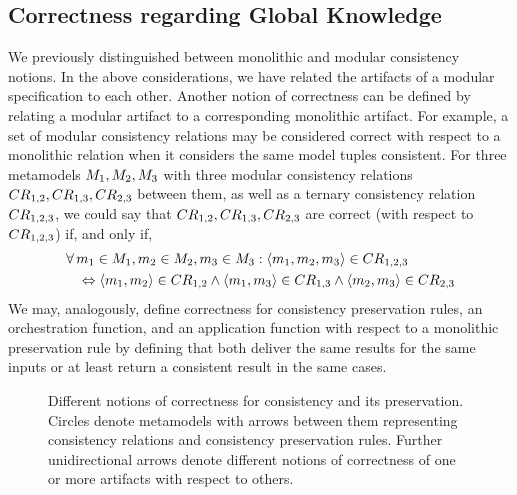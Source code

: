\subsection{Correctness regarding Global Knowledge}

We previously distinguished between monolithic and modular consistency notions.
In the above considerations, we have related the artifacts of a modular specification to each other.
Another notion of correctness can be defined by relating a modular artifact to a corresponding monolithic artifact.
For example, a set of modular consistency relations may be considered correct with respect to a monolithic relation when it considers the same model tuples consistent.
For three metamodels $\metamodel{M}{1}, \metamodel{M}{2}, \metamodel{M}{3}$ with three modular consistency relations $\consistencyrelation{CR}{1,2}, \consistencyrelation{CR}{1,3}, \consistencyrelation{CR}{2,3}$ between them, as well as a ternary consistency relation $\consistencyrelation{CR}{1,2,3}$, we could say that $\consistencyrelation{CR}{1,2}, \consistencyrelation{CR}{1,3}, \consistencyrelation{CR}{2,3}$ are correct (with respect to $\consistencyrelation{CR}{1,2,3}$) if, and only if,
\begin{align*}
    & \forall \model{m}{1} \in \metamodel{M}{1}, \model{m}{2} \in \metamodel{M}{2}, \model{m}{3} \in \metamodel{M}{3}: \tupled{\model{m}{1}, \model{m}{2}, \model{m}{3}} \in \consistencyrelation{CR}{1,2,3} \\
    & \formulaskip
    \equivalent \tupled{\model{m}{1}, \model{m}{2}} \in \consistencyrelation{CR}{1,2} \land \tupled{\model{m}{1}, \model{m}{3}} \in \consistencyrelation{CR}{1,3} \land \tupled{\model{m}{2}, \model{m}{3}} \in \consistencyrelation{CR}{2,3}
\end{align*}
%
We may, analogously, define correctness for consistency preservation rules, an orchestration function, and an application function with respect to a monolithic preservation rule by defining that both deliver the same results for the same inputs or at least return a consistent result in the same cases.

\begin{figure}
    \centering
    
    \caption[Notions of correctness for consistency and its preservation]{Different notions of correctness for consistency and its preservation. Circles denote metamodels with arrows between them representing consistency relations and consistency preservation rules. Further unidirectional arrows denote different notions of correctness of one or more artifacts with respect to others.}
    \label{fig:correctness:correctness_notions}
\end{figure}


